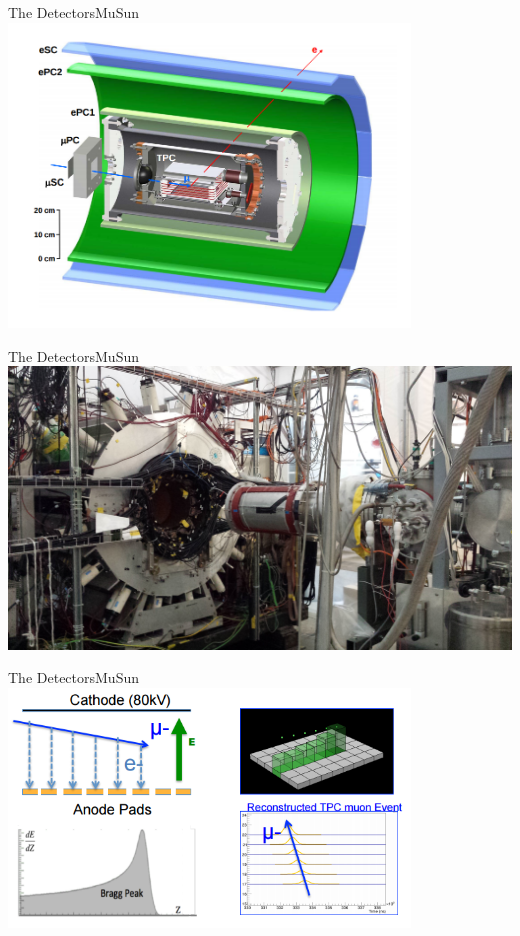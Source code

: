 \documentclass{beamer}
\begin{document}
\begin{frame}{The Detectors}{MuSun}
\centering
\includegraphics[width=0.8\textwidth]{figures/tpc.png}
\let\thefootnote\relax{}
\end{frame}
\begin{frame}{The Detectors}{MuSun}
\centering
\includegraphics[width=\textwidth]{figures/tpc.jpg}
\end{frame}


\begin{frame}{The Detectors}{MuSun}
\centering
\includegraphics[width=0.8\textwidth]{figures/tpc_2.png}
\let\thefootnote\relax{}
\end{frame}
\end{document}
